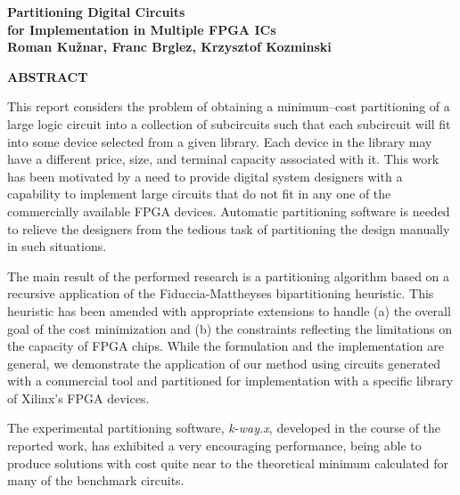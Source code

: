 
\vskip 5.75cm

\begin{center}

{\Large \bf
Partitioning Digital Circuits   \\
\vskip 0.25cm
for Implementation in Multiple FPGA ICs \\
}
\vspace{0.75cm}
{\normalsize \bf Roman Ku\v znar, Franc Brglez, Krzysztof
Kozminski}

\vskip 3.0cm

{\large \bf ABSTRACT}
\end{center}
\vskip 0.5cm

This report considers the problem of obtaining a minimum--cost
partitioning of a large logic circuit into a collection of 
subcircuits such that each subcircuit will fit into some
device selected from a given library.
Each device in the library may have a different price, size, and
terminal capacity associated with it.
This work has been motivated by a need to provide digital system designers
with a capability to implement large circuits that do not fit in any one
of the commercially available FPGA devices.
Automatic partitioning software is needed to relieve the designers from the
tedious task of partitioning the design manually in such situations.

\vskip 6pt

The main result of the performed research is a partitioning algorithm
based on a recursive application of the Fiduccia-Mattheyses bipartitioning
heuristic.
This heuristic has been amended
with appropriate extensions to handle (a) the overall goal of the
cost minimization and (b) the constraints reflecting the
limitations on the capacity of FPGA chips.
While the formulation and the implementation 
are general, we demonstrate the application of our method
using circuits generated with a commercial tool and partitioned
for implementation with a specific library of Xilinx's FPGA devices.

\vskip 6pt

The experimental partitioning software, {\sl k-way.x}, developed in the
course of the reported work, has exhibited a very encouraging performance,
being able to produce solutions with cost quite near to the theoretical
minimum calculated for many of the benchmark circuits.


